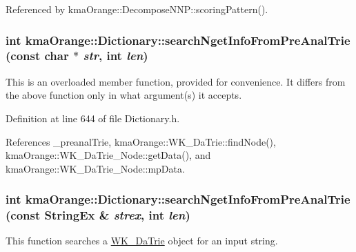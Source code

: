 Referenced by kmaOrange::DecomposeNNP::scoringPattern().\hypertarget{classkmaOrange_1_1Dictionary_6f7f3b672bdf9237c59382bbc91cca0e}{
\subsubsection[{searchNgetInfoFromPreAnalTrie}]{\setlength{\rightskip}{0pt plus 5cm}int kmaOrange::Dictionary::searchNgetInfoFromPreAnalTrie (const char $\ast$ {\em str}, \/  int {\em len})}}
\label{classkmaOrange_1_1Dictionary_6f7f3b672bdf9237c59382bbc91cca0e}


This is an overloaded member function, provided for convenience. It differs from the above function only in what argument(s) it accepts. 

Definition at line 644 of file Dictionary.h.

References \_\-preanalTrie, kmaOrange::WK\_\-DaTrie::findNode(), kmaOrange::WK\_\-DaTrie\_\-Node::getData(), and kmaOrange::WK\_\-DaTrie\_\-Node::mpData.\hypertarget{classkmaOrange_1_1Dictionary_ff6f74c242f04a96d3be83168ad56504}{
\subsubsection[{searchNgetInfoFromPreAnalTrie}]{\setlength{\rightskip}{0pt plus 5cm}int kmaOrange::Dictionary::searchNgetInfoFromPreAnalTrie (const {\bf StringEx} \& {\em strex}, \/  int {\em len})}}
\label{classkmaOrange_1_1Dictionary_ff6f74c242f04a96d3be83168ad56504}


This function searches a \hyperlink{classkmaOrange_1_1WK__DaTrie}{WK\_\-DaTrie} object for an input string. 

